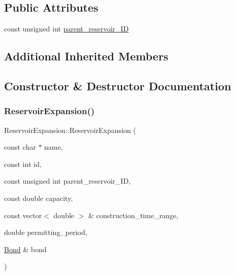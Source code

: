\subsection*{Public Attributes}
\begin{DoxyCompactItemize}
\item 
const unsigned int \mbox{\hyperlink{classReservoirExpansion_a56527196174404cfed20b863df2ab0ba}{parent\+\_\+reservoir\+\_\+\+ID}}
\end{DoxyCompactItemize}
\subsection*{Additional Inherited Members}


\subsection{Constructor \& Destructor Documentation}
\mbox{\label{classReservoirExpansion_aa742cae4276e97847681dac4f828b5ae}} 
\subsubsection{\texorpdfstring{Reservoir\+Expansion()}{ReservoirExpansion()}\hspace{0.1cm}{\footnotesize\ttfamily [1/2]}}
{\footnotesize\ttfamily Reservoir\+Expansion\+::\+Reservoir\+Expansion (\begin{DoxyParamCaption}\item[{const char $\ast$}]{name,  }\item[{const int}]{id,  }\item[{const unsigned int}]{parent\+\_\+reservoir\+\_\+\+ID,  }\item[{const double}]{capacity,  }\item[{const vector$<$ double $>$ \&}]{construction\+\_\+time\+\_\+range,  }\item[{double}]{permitting\+\_\+period,  }\item[{\mbox{\hyperlink{classBond}{Bond}} \&}]{bond }\end{DoxyParamCaption})}

\mbox{\label{classReservoirExpansion_abc10a6725f7fb85b7478fb6b0b79bd1e}} 
